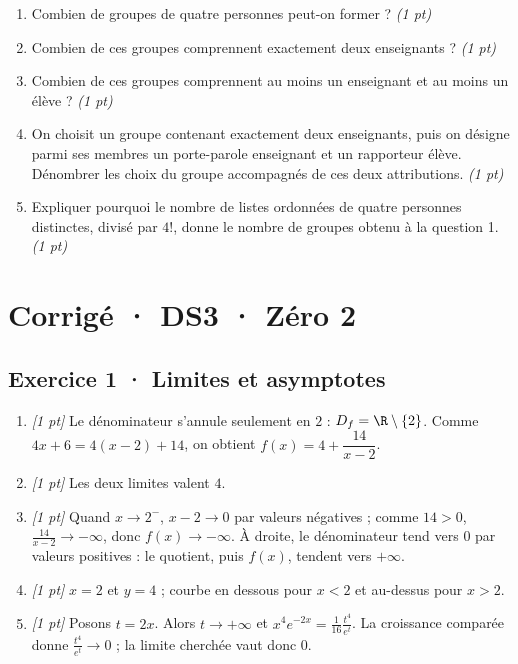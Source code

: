 \begin{enumerate}

\item Combien de groupes de quatre personnes peut-on former ? \hfill\textit{(1 pt)}

\item Combien de ces groupes comprennent exactement deux enseignants ? \hfill\textit{(1 pt)}

\item Combien de ces groupes comprennent au moins un enseignant et au moins un élève ? \hfill\textit{(1 pt)}

\item On choisit un groupe contenant exactement deux enseignants, puis on désigne parmi ses membres un porte-parole enseignant et un rapporteur élève. Dénombrer les choix du groupe accompagnés de ces deux attributions. \hfill\textit{(1 pt)}

\item Expliquer pourquoi le nombre de listes ordonnées de quatre personnes distinctes, divisé par $4!$, donne le nombre de groupes obtenu à la question 1. \hfill\textit{(1 pt)}

\end{enumerate}

\ifmxteacher\mxnewpage

\section*{Corrigé · DS3 · Zéro 2}\label{cor:4-2}

\subsection*{Exercice 1 · Limites et asymptotes}\begin{enumerate}

\item \textit{[1 pt]} Le dénominateur s'annule seulement en $2$ : $D_f=\R\setminus\{2\}$. Comme $4x+6=4(x-2)+14$, on obtient $f(x)=4+\dfrac{14}{x-2}$.

\item \textit{[1 pt]} Les deux limites valent $4$.

\item \textit{[1 pt]} Quand $x\to 2^-$, $x-2\to0$ par valeurs négatives ; comme $14>0$, $\frac{14}{x-2}\to-\infty$, donc $f(x)\to-\infty$. À droite, le dénominateur tend vers $0$ par valeurs positives : le quotient, puis $f(x)$, tendent vers $+\infty$.

\item \textit{[1 pt]} $x=2$ et $y=4$ ; courbe en dessous pour $x<2$ et au-dessus pour $x>2$.

\item \textit{[1 pt]} Posons $t=2x$. Alors $t\to+\infty$ et $x^4e^{-2x}=\frac{1}{16}\frac{t^4}{e^t}$. La croissance comparée donne $\frac{t^4}{e^t}\to0$ ; la limite cherchée vaut donc $0$.

\end{enumerate}

